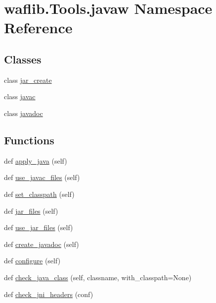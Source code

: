 \hypertarget{namespacewaflib_1_1_tools_1_1javaw}{}\section{waflib.\+Tools.\+javaw Namespace Reference}
\label{namespacewaflib_1_1_tools_1_1javaw}
\subsection*{Classes}
\begin{DoxyCompactItemize}
\item 
class \hyperlink{classwaflib_1_1_tools_1_1javaw_1_1jar__create}{jar\+\_\+create}
\item 
class \hyperlink{classwaflib_1_1_tools_1_1javaw_1_1javac}{javac}
\item 
class \hyperlink{classwaflib_1_1_tools_1_1javaw_1_1javadoc}{javadoc}
\end{DoxyCompactItemize}
\subsection*{Functions}
\begin{DoxyCompactItemize}
\item 
def \hyperlink{namespacewaflib_1_1_tools_1_1javaw_ac199170f2d825ba6563c59c3bd93c898}{apply\+\_\+java} (self)
\item 
def \hyperlink{namespacewaflib_1_1_tools_1_1javaw_af6ba463843a18b6c3bde4c507f6a6654}{use\+\_\+javac\+\_\+files} (self)
\item 
def \hyperlink{namespacewaflib_1_1_tools_1_1javaw_a9015681f9dcfa3b4e80782ca246368ed}{set\+\_\+classpath} (self)
\item 
def \hyperlink{namespacewaflib_1_1_tools_1_1javaw_a557eb69ce06510674c61863be0eb2f36}{jar\+\_\+files} (self)
\item 
def \hyperlink{namespacewaflib_1_1_tools_1_1javaw_a496633c2b59e5d16289419ba27b18e8d}{use\+\_\+jar\+\_\+files} (self)
\item 
def \hyperlink{namespacewaflib_1_1_tools_1_1javaw_a55269df6bcde18d795800b8f27857346}{create\+\_\+javadoc} (self)
\item 
def \hyperlink{namespacewaflib_1_1_tools_1_1javaw_a9a5bcdc227e3a524810c87bd1dc26b3f}{configure} (self)
\item 
def \hyperlink{namespacewaflib_1_1_tools_1_1javaw_addfef2e4d74b783f1c3633872f1b3fcb}{check\+\_\+java\+\_\+class} (self, classname, with\+\_\+classpath=None)
\item 
def \hyperlink{namespacewaflib_1_1_tools_1_1javaw_a239ae8003166984f2141e9c2f9d58366}{check\+\_\+jni\+\_\+headers} (conf)
\end{DoxyCompactItemize}
